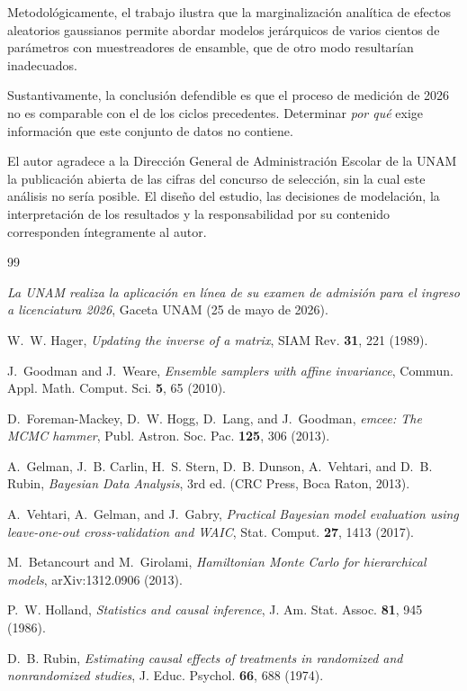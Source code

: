 \documentclass[aps,prd,reprint,amsmath,amssymb,nofootinbib,superscriptaddress]{revtex4-2}
\begin{document}
Metodol\'ogicamente, el trabajo ilustra que la marginalizaci\'on
anal\'itica de efectos aleatorios gaussianos permite abordar modelos
jer\'arquicos de varios cientos de par\'ametros con muestreadores de
ensamble, que de otro modo resultar\'ian inadecuados.

Sustantivamente, la conclusi\'on defendible es que el proceso de medici\'on
de 2026 no es comparable con el de los ciclos precedentes. Determinar
\emph{por qu\'e} exige informaci\'on que este conjunto de datos no
contiene.

\begin{acknowledgments}
El autor agradece a la Direcci\'on General de Administraci\'on Escolar de
la UNAM la publicaci\'on abierta de las cifras del concurso de
selecci\'on, sin la cual este an\'alisis no ser\'ia posible. El
dise\~no del estudio, las decisiones de modelaci\'on, la interpretaci\'on
de los resultados y la responsabilidad por su contenido corresponden
\'integramente al autor.
\end{acknowledgments}

\begin{thebibliography}{99}

\emph{La UNAM realiza la aplicaci\'on en l\'inea de su examen de
admisi\'on para el ingreso a licenciatura 2026}, Gaceta UNAM
(25 de mayo de 2026).

W.~W. Hager, \emph{Updating the inverse of a matrix},
SIAM Rev. \textbf{31}, 221 (1989).

J.~Goodman and J.~Weare, \emph{Ensemble samplers with affine invariance},
Commun. Appl. Math. Comput. Sci. \textbf{5}, 65 (2010).

D.~Foreman-Mackey, D.~W. Hogg, D.~Lang, and J.~Goodman,
\emph{emcee: The MCMC hammer},
Publ. Astron. Soc. Pac. \textbf{125}, 306 (2013).

A.~Gelman, J.~B. Carlin, H.~S. Stern, D.~B. Dunson, A.~Vehtari, and
D.~B. Rubin, \emph{Bayesian Data Analysis}, 3rd ed.
(CRC Press, Boca Raton, 2013).

A.~Vehtari, A.~Gelman, and J.~Gabry, \emph{Practical Bayesian model
evaluation using leave-one-out cross-validation and WAIC},
Stat. Comput. \textbf{27}, 1413 (2017).

M.~Betancourt and M.~Girolami, \emph{Hamiltonian Monte Carlo for
hierarchical models}, arXiv:1312.0906 (2013).

P.~W. Holland, \emph{Statistics and causal inference},
J. Am. Stat. Assoc. \textbf{81}, 945 (1986).

D.~B. Rubin, \emph{Estimating causal effects of treatments in randomized
and nonrandomized studies},
J. Educ. Psychol. \textbf{66}, 688 (1974).

\end{thebibliography}
\end{document}
